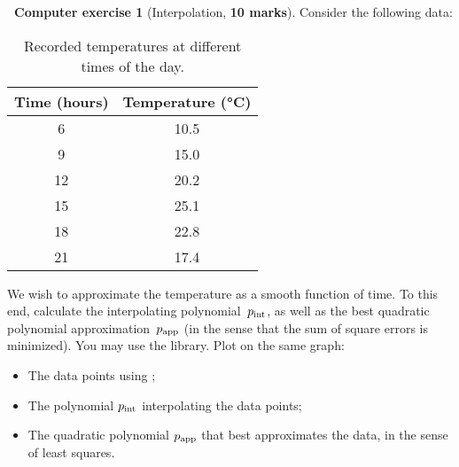 \documentclass[10pt]{article}
\theoremstyle{definition}
\newtheorem{compexercise}{{\normalfont \faLaptop}~Computer exercise}
\theoremstyle{remark}
\begin{document}
\begin{compexercise}
    [Interpolation, \textbf{10 marks}]
    Consider the following data:
    \begin{table}[h!]
        \centering
        \begin{tabular}{|c|c|}
            \hline
            \textbf{Time (hours)} & \textbf{Temperature (°C)} \\
            \hline
            6  & 10.5 \\
            \hline
            9  & 15.0 \\
            \hline
            12 & 20.2 \\
            \hline
            15 & 25.1 \\
            \hline
            18 & 22.8 \\
            \hline
            21 & 17.4 \\
            \hline
        \end{tabular}
        \caption{Recorded temperatures at different times of the day.}
    \end{table}

    We wish to approximate the temperature as a smooth function of time.
    To this end, calculate the interpolating polynomial~$p_{\rm int}$, 
    as well as the best quadratic polynomial approximation~$p_{\rm app}$ (in the sense that the sum of square errors is minimized).
    You may use the  library.
    Plot on the same graph:
    \begin{itemize}
        \item The data points using ;
        \item The polynomial $p_{\rm int}$ interpolating the data points;
        \item The quadratic polynomial $p_{\rm app}$ that best approximates the data,
            in the sense of least squares.
    \end{itemize}
\end{compexercise}
\end{document}
